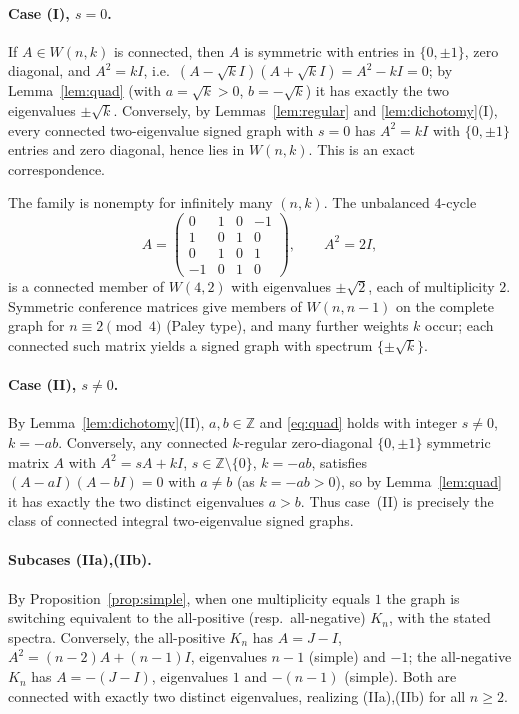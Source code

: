 \documentclass{amsart}
\theoremstyle{definition}
\begin{document}
\paragraph{Case (I), $s=0$.}
If $A\in W(n,k)$ is connected, then $A$ is symmetric with entries in
$\{0,\pm1\}$, zero diagonal, and $A^2=kI$, i.e.\ $(A-\sqrt kI)(A+\sqrt kI)=
A^2-kI=0$; by Lemma~\ref{lem:quad} (with $a=\sqrt k>0$, $b=-\sqrt k$) it has
exactly the two eigenvalues $\pm\sqrt k$. Conversely, by
Lemmas~\ref{lem:regular} and \ref{lem:dichotomy}(I), every connected
two-eigenvalue signed graph with $s=0$ has $A^2=kI$ with $\{0,\pm1\}$ entries
and zero diagonal, hence lies in $W(n,k)$. This is an exact correspondence.

The family is nonempty for infinitely many $(n,k)$. The unbalanced $4$-cycle
\[
A=\begin{pmatrix}0&1&0&-1\\ 1&0&1&0\\ 0&1&0&1\\ -1&0&1&0\end{pmatrix},
\qquad A^2=2I,
\]
is a connected member of $W(4,2)$ with eigenvalues $\pm\sqrt2$, each of
multiplicity $2$. Symmetric conference matrices give members of $W(n,n-1)$ on
the complete graph for $n\equiv2\pmod4$ (Paley type), and many further weights
$k$ occur; each connected such matrix yields a signed graph with spectrum
$\{\pm\sqrt k\}$.

\paragraph{Case (II), $s\ne0$.}
By Lemma~\ref{lem:dichotomy}(II), $a,b\in\mathbb Z$ and \eqref{eq:quad} holds
with integer $s\ne0$, $k=-ab$. Conversely, any connected $k$-regular
zero-diagonal $\{0,\pm1\}$ symmetric matrix $A$ with $A^2=sA+kI$,
$s\in\mathbb Z\setminus\{0\}$, $k=-ab$, satisfies $(A-aI)(A-bI)=0$ with $a\ne
b$ (as $k=-ab>0$), so by Lemma~\ref{lem:quad} it has exactly the two distinct
eigenvalues $a>b$. Thus case~(II) is precisely the class of connected integral
two-eigenvalue signed graphs.

\paragraph{Subcases (IIa),(IIb).}
By Proposition~\ref{prop:simple}, when one multiplicity equals $1$ the graph is
switching equivalent to the all-positive (resp.\ all-negative) $K_n$, with the
stated spectra. Conversely, the all-positive $K_n$ has $A=J-I$,
$A^2=(n-2)A+(n-1)I$, eigenvalues $n-1$ (simple) and $-1$; the all-negative
$K_n$ has $A=-(J-I)$, eigenvalues $1$ and $-(n-1)$ (simple). Both are connected
with exactly two distinct eigenvalues, realizing (IIa),(IIb) for all $n\ge2$.
\end{document}

